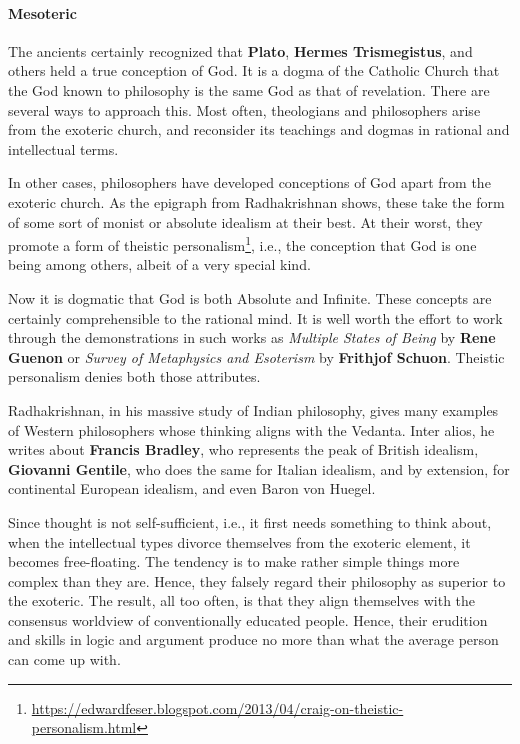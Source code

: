 \paragraph{Mesoteric}
The ancients certainly recognized that \textbf{Plato}, \textbf{Hermes Trismegistus}, and others held a true conception of God. It is a dogma of the Catholic Church that the God known to philosophy is the same God as that of revelation. There are several ways to approach this. Most often, theologians and philosophers arise from the exoteric church, and reconsider its teachings and dogmas in rational and intellectual terms.

In other cases, philosophers have developed conceptions of God apart from the exoteric church. As the epigraph from Radhakrishnan shows, these take the form of some sort of monist or absolute idealism at their best. At their worst, they promote a form of theistic personalism\footnote{\url{https://edwardfeser.blogspot.com/2013/04/craig-on-theistic-personalism.html}}, i.e., the conception that God is one being among others, albeit of a very special kind.

Now it is dogmatic that God is both Absolute and Infinite. These concepts are certainly comprehensible to the rational mind. It is well worth the effort to work through the demonstrations in such works as \emph{Multiple States of Being} by \textbf{Rene Guenon} or \emph{Survey of Metaphysics and Esoterism} by \textbf{Frithjof Schuon}. Theistic personalism denies both those attributes.

Radhakrishnan, in his massive study of Indian philosophy, gives many examples of Western philosophers whose thinking aligns with the Vedanta. Inter alios, he writes about \textbf{Francis Bradley}, who represents the peak of British idealism, \textbf{Giovanni Gentile}, who does the same for Italian idealism, and by extension, for continental European idealism, and even Baron von Huegel.

Since thought is not self-sufficient, i.e., it first needs something to think about, when the intellectual types divorce themselves from the exoteric element, it becomes free-floating. The tendency is to make rather simple things more complex than they are. Hence, they falsely regard their philosophy as superior to the exoteric. The result, all too often, is that they align themselves with the consensus worldview of conventionally educated people. Hence, their erudition and skills in logic and argument produce no more than what the average person can come up with.

